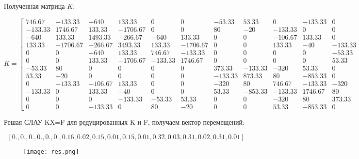 \documentclass[a4paper, 12pt]{article}
\begin{document}
Полученная матрица \(K\):
\newpage
\begin{landscape}
\[
K = 
\begin{bmatrix}
746.67 & -133.33 & -640 & 133.33 & 0 & 0 & -53.33 & 53.33 & 0 & -133.33 & 0 & 0 \\
-133.33 & 1746.67 & 133.33 & -1706.67 & 0 & 0 & 80 & -20 & -133.33 & 0 & 0 & 0 \\
-640 & 133.33 & 1493.33 & -266.67 & -640 & 133.33 & 0 & 0 & -106.67 & 133.33 & 0 & -133.33 \\
133.33 & -1706.67 & -266.67 & 3493.33 & 133.33 & -1706.67 & 0 & 0 & 133.33 & -40 & -133.33 & 0 \\
0 & 0 & -640 & 133.33 & 746.67 & -133.33 & 0 & 0 & 0 & 0 & -53.33 & 80 \\
0 & 0 & 133.33 & -1706.67 & -133.33 & 1746.67 & 0 & 0 & 0 & 0 & 53.33 & -20 \\
-53.33 & 80 & 0 & 0 & 0 & 0 & 373.33 & -133.33 & -320 & 53.33 & 0 & 0 \\
53.33 & -20 & 0 & 0 & 0 & 0 & -133.33 & 873.33 & 80 & -853.33 & 0 & 0 \\
0 & -133.33 & -106.67 & 133.33 & 0 & 0 & -320 & 80 & 746.67 & -133.33 & -320 & 53.33 \\
-133.33 & 0 & 133.33 & -40 & 0 & 0 & 53.33 & -853.33 & -133.33 & 1746.67 & 80 & -853.33 \\
0 & 0 & 0 & -133.33 & -53.33 & 53.33 & 0 & 0 & -320 & 80 & 373.33 & 0 \\
0 & 0 & -133.33 & 0 & 80 & -20 & 0 & 0 & 53.33 & -853.33 & 0 & 873.33
\end{bmatrix}
\]
\end{landscape}

Решая СЛАУ KX=F для редуцированных K и F, получаем вектор перемещений:

\[ [0.,   0. ,   0.,    0.  ,  0. ,   0. ,   0.16,  0.02,  0.15 , 0.01 , 0.15, 0.01, 0.32,  0.03,  0.31,  0.02,  0.31,  0.01] \]

\begin{figure}[h]
	\centering
\texttt{[image: res.png]}
\end{figure} 
\end{document}
